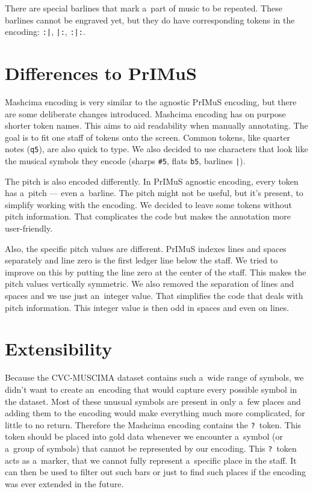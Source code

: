 There are special barlines that mark a~part of music to be repeated. These barlines cannot be engraved yet, but they do have corresponding tokens in the encoding: \verb`:|`, \verb`|:`, \verb`:|:`.


\section{Differences to PrIMuS}

Mashcima encoding is very similar to the agnostic PrIMuS encoding, but there are some deliberate changes introduced. Mashcima encoding has on purpose shorter token names. This aims to aid readability when manually annotating. The goal is to fit one staff of tokens onto the screen. Common tokens, like quarter notes (\verb`q5`), are also quick to type. We also decided to use characters that look like the musical symbols they encode (sharps \verb`#5`, flats \verb`b5`, barlines \verb`|`).

The pitch is also encoded differently. In PrIMuS agnostic encoding, every token has a~pitch --- even a~barline. The pitch might not be useful, but it's present, to simplify working with the encoding. We decided to leave some tokens without pitch information. That complicates the code but makes the annotation more user-friendly.

Also, the specific pitch values are different. PrIMuS indexes lines and spaces separately and line zero is the first ledger line below the staff. We tried to improve on this by putting the line zero at the center of the staff. This makes the pitch values vertically symmetric. We also removed the separation of lines and spaces and we use just an~integer value. That simplifies the code that deals with pitch information. This integer value is then odd in spaces and even on lines.


\section{Extensibility}
\label{sec:RepresentationExtensibility}

Because the CVC-MUSCIMA dataset contains such a~wide range of symbols, we didn't want to create an~encoding that would capture every possible symbol in the dataset. Most of these unusual symbols are present in only a~few places and adding them to the encoding would make everything much more complicated, for little to no return. Therefore the Mashcima encoding contains the \verb`?`~token. This token should be placed into gold data whenever we encounter a~symbol (or a~group of symbols) that cannot be represented by our encoding. This \verb`?`~token acts as a~marker, that we cannot fully represent a~specific place in the staff. It can then be used to filter out such bars or just to find such places if the encoding was ever extended in the future.

